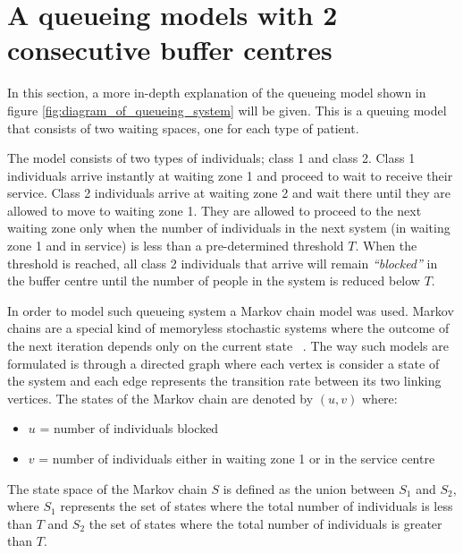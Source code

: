 \section{A queueing models with 2 consecutive buffer centres}

In this section, a more in-depth explanation of the queueing model shown in 
figure \ref{fig:diagram_of_queueing_system} will be given.
This is a queuing model that consists of two waiting spaces, one for each type
of patient.

The model consists of two types of individuals; class 1 and class 2.
Class 1 individuals arrive instantly at waiting zone 1 and proceed to wait to
receive their service. 
Class 2 individuals arrive at waiting zone 2 and wait there until they are 
allowed to move to waiting zone 1. 
They are allowed to proceed to the next waiting zone only when the number of 
individuals in the next system (in waiting zone 1 and in service) is less than a 
pre-determined threshold \(T\).
When the threshold is reached, all class 2 individuals that arrive will remain 
\textit{``blocked''} in the buffer centre until the number of people in the 
system is reduced below \(T\). 


In order to model such queueing system a Markov chain model was used.
Markov chains are a special kind of memoryless stochastic systems where the 
outcome of the next iteration depends only on the current state
~\cite{kemeny1976markov}. 
The way such models are formulated is through a directed graph where each vertex
is consider a state of the system and each edge represents the transition rate
between its two linking vertices.
The states of the Markov chain are denoted by \((u,v)\) where:

\begin{itemize}
    \item \(u\) = number of individuals blocked
    \item \(v\) = number of individuals either in waiting zone 1 or in the
    service centre
\end{itemize}


The state space of the Markov chain \(S\) is defined as the union between
\(S_1\) and \(S_2\), where \(S_1\) represents the set of states where the total 
number of individuals is less than \(T\) and \(S_2\) the set of states where the
total number of individuals is greater than \(T\). 

